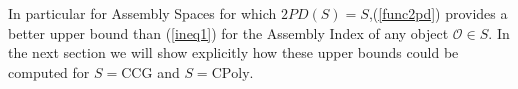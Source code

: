\documentclass[letterpaper,12pt]{article}
\theoremstyle{definition}
\newtheorem{theorem}{Theorem}
\newtheorem{definition}{Definition}
\begin{document}

In particular for Assembly Spaces for which $2PD(S)=S$,(\ref{func2pd}) provides a better upper bound than (\ref{ineq1}) for the Assembly Index of any object $\mathscr{O} \in S$. In the next section we will show explicitly how these upper bounds could be computed for $S=\text{CCG}$ and $S=\text{CPoly}$.








\end{document}
